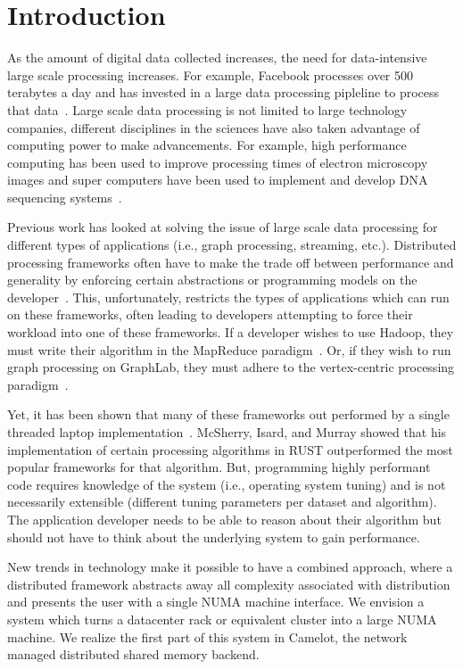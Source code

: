 \section{Introduction} 
\label{sec:intro}
As the amount of digital data collected increases, the need for data-intensive
large scale processing increases. For example, Facebook processes over 500
terabytes a day and has invested in a large data processing pipleline to process
that data~\cite{Chen2016}. Large scale data processing is not limited to large
technology companies, different disciplines in the sciences have also taken
advantage of computing power to make advancements. For example, high performance
computing has been used to improve processing times of electron microscopy
images and super computers have been used to implement and develop DNA
sequencing systems~\cite{Puckelwartz2017,Oelerich2017}.

Previous work has looked at solving the issue of large scale data processing for
different types of applications (i.e., graph processing, streaming, etc.).
Distributed processing frameworks often have to make the trade off between
performance and generality by enforcing certain abstractions or programming
models on the developer~\cite{Dean2004,Low2010,Murray2013}. 
This, unfortunately, restricts the types of applications which can run on these
frameworks, often leading to developers attempting to force their workload into
one of these frameworks. If a developer wishes to use Hadoop, they must write
their algorithm in the MapReduce paradigm~\cite{Dean2004}. Or, if they wish to
run graph processing on GraphLab, they must adhere to the vertex-centric
processing paradigm~\cite{Low2010}.

Yet, it has been shown that many of these frameworks out performed by a single
threaded laptop implementation~\cite{189908}. McSherry, Isard, and Murray showed that his
implementation of certain processing algorithms in RUST outperformed the most
popular frameworks for that algorithm. But, programming highly performant code
requires knowledge of the system (i.e., operating system tuning) and is not
necessarily extensible  (different tuning parameters per dataset and algorithm).
The application developer needs to be able to reason about their algorithm but
should not have to think about the underlying system to gain performance. 

New trends in technology make it possible to have a combined approach, where a
distributed framework abstracts away all complexity associated with distribution
and presents the user with a single NUMA machine interface. We envision a system
which turns a datacenter rack or equivalent cluster into a large NUMA machine.
We realize the first part of this system in Camelot, the network managed
distributed shared memory backend. 

